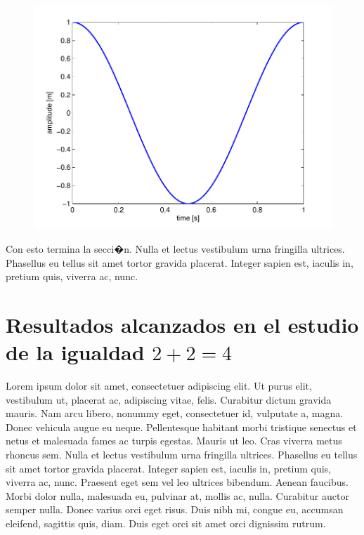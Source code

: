 \documentclass[10pt,twoside]{rcmart} %
\begin{document}
\begin{figure}[ht]\centering
\includegraphics[width=\linewidth]{results}
\label{fig:results}
\end{figure}

Con esto termina la secci�n. Nulla et lectus vestibulum urna fringilla ultrices. Phasellus eu tellus sit amet tortor gravida placerat. Integer sapien est, iaculis in, pretium quis, viverra ac, nunc.

\section{Resultados alcanzados en el estudio de la igualdad $2 + 2 = 4$}

Lorem ipsum dolor sit amet, consectetuer adipiscing elit. Ut purus elit, vestibulum ut, placerat ac, adipiscing vitae, felis. Curabitur dictum gravida mauris. Nam arcu libero, nonummy eget, consectetuer id, vulputate a, magna. Donec vehicula augue eu neque. Pellentesque habitant morbi tristique senectus et netus et malesuada fames ac turpis egestas. Mauris ut leo. Cras viverra metus rhoncus sem. Nulla et lectus vestibulum urna fringilla ultrices. Phasellus eu tellus sit amet tortor gravida placerat. Integer sapien est, iaculis in, pretium quis, viverra ac, nunc. Praesent eget sem vel leo ultrices bibendum. Aenean faucibus. Morbi dolor nulla, malesuada eu, pulvinar at, mollis ac, nulla. Curabitur auctor semper nulla. Donec varius orci eget risus. Duis nibh mi, congue eu, accumsan eleifend, sagittis quis, diam. Duis eget orci sit amet orci dignissim rutrum.
\end{document}
